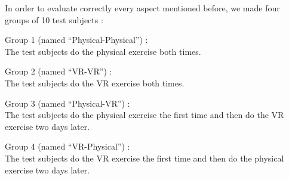 \documentclass[12pt, openany, twocolumn]{article}
\begin{document}
    In order to evaluate correctly every aspect mentioned before, we made four groups of 10 test subjects :
    \begin{description}
        \item{Group 1 (named ``Physical-Physical'') :} \\
        The test subjects do the physical exercise both times.
        \item{Group 2 (named ``VR-VR'') :} \\
        The test subjects do the VR exercise both times.
        \item{Group 3 (named ``Physical-VR'') :} \\
        The test subjects do the physical exercise the first time and then do the VR exercise two days later.
        \item{Group 4 (named ``VR-Physical'') :} \\
        The test subjects do the VR exercise the first time and then do the physical exercise two days later.
    \end{description}





\end{document}
